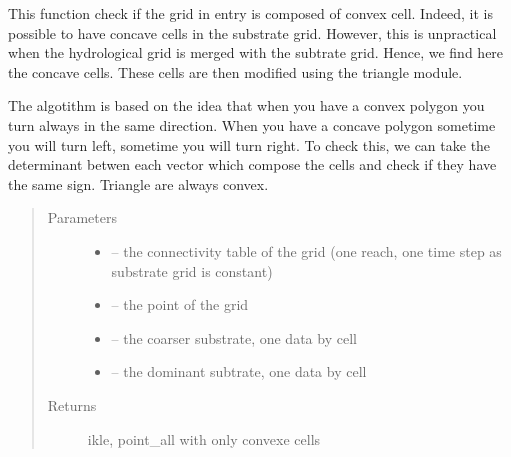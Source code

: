 \documentclass[letterpaper,10pt,english]{sphinxmanual}
\begin{document}
\begin{fulllineitems}
\label{\detokenize{index:src.substrate.modify_grid_if_concave}}
This function check if the grid in entry is composed of convex cell. Indeed, it is possible to have concave
cells in the substrate grid. However, this is unpractical when the hydrological grid is merged with the subtrate
grid. Hence, we find here the concave cells. These cells are then modified using the triangle module.

The algotithm is based on the idea that when you have a convex polygon you turn always in the same direction.
When you have a concave polygon sometime you will turn left, sometime you will turn right. To check this,
we can take the determinant betwen each vector which compose the cells and check if they have the same sign.
Triangle are always convex.
\begin{quote}\begin{description}
\item[{Parameters}] \leavevmode\begin{itemize}
\item {} 
 -- the connectivity table of the grid (one reach, one time step as substrate grid is constant)

\item {} 
 -- the point of the grid

\item {} 
 -- the coarser substrate, one data by cell

\item {} 
 -- the dominant subtrate, one data by cell

\end{itemize}

\item[{Returns}] \leavevmode
ikle, point\_all with only convexe cells

\end{description}\end{quote}

\end{fulllineitems}

\end{document}
